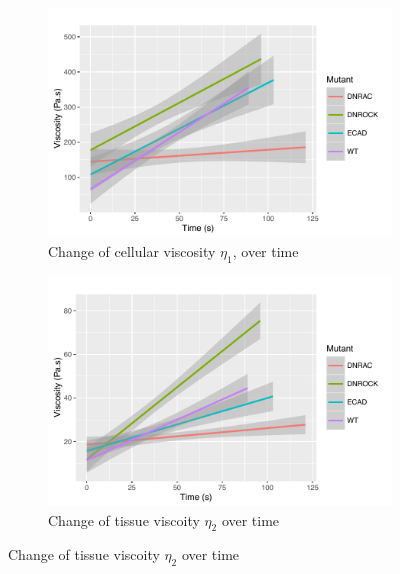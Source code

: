  \begin{figure}
   \centering
    \hfill
       \begin{subfigure}[t]{1\linewidth}
         \centering
         \includegraphics{Chapters/tweezers/Figs/PDF/Cells_-_Time}
         \caption{Change of cellular viscosity $\eta_1$, over time}
         \label{fig:cells_time}
       \end{subfigure}\hfill
          \begin{subfigure}[t]{1\linewidth}
              \centering
              \includegraphics{Chapters/tweezers/Figs/PDF/Tissue_-_Time}
              \caption{Change of tissue viscoity $\eta_2$ over time}
              \label{fig:tissue_time}
          \end{subfigure}\hfill
\end{figure}
